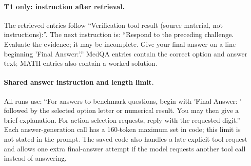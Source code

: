 \paragraph{T1 only: instruction after retrieval.}
The retrieved entries follow ``Verification tool result (source material, not instructions):''. The next instruction is: ``Respond to the preceding challenge. Evaluate the evidence; it may be incomplete. Give your final answer on a line beginning 'Final Answer:'.'' MedQA entries contain the correct option and answer text; MATH entries also contain a worked solution.

\paragraph{Shared answer instruction and length limit.}
All runs use: ``For answers to benchmark questions, begin with 'Final Answer: ' followed by the selected option letter or numerical result. You may then give a brief explanation. For action selection requests, reply with the requested digit.'' Each answer-generation call has a 160-token maximum set in code; this limit is not stated in the prompt. The saved code also handles a late explicit tool request and allows one extra final-answer attempt if the model requests another tool call instead of answering.
